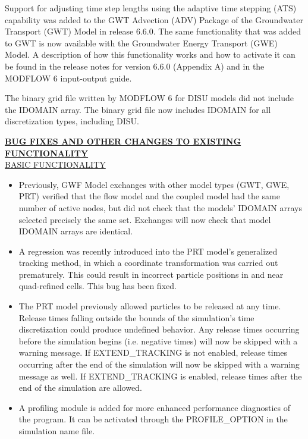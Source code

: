 	
\item \currentmodflowversion
	
	\item Support for adjusting time step lengths using the adaptive time stepping (ATS) capability was added to the GWT Advection (ADV) Package of the Groundwater Transport (GWT) Model in release 6.6.0.  The same functionality that was added to GWT is now available with the Groundwater Energy Transport (GWE) Model.  A description of how this functionality works and how to activate it can be found in the release notes for version 6.6.0 (Appendix A) and in the MODFLOW 6 input-output guide.
	\item The binary grid file written by MODFLOW 6 for DISU models did not include the IDOMAIN array.  The binary grid file now includes IDOMAIN for all discretization types, including DISU.


\textbf{\underline{BUG FIXES AND OTHER CHANGES TO EXISTING FUNCTIONALITY}} \\
\underline{BASIC FUNCTIONALITY}
\begin{itemize}
	\item Previously, GWF Model exchanges with other model types (GWT, GWE, PRT) verified that the flow model and the coupled model had the same number of active nodes, but did not check that the models' IDOMAIN arrays selected precisely the same set. Exchanges will now check that model IDOMAIN arrays are identical.
	\item A regression was recently introduced into the PRT model's generalized tracking method, in which a coordinate transformation was carried out prematurely. This could result in incorrect particle positions in and near quad-refined cells. This bug has been fixed.
	\item The PRT model previously allowed particles to be released at any time. Release times falling outside the bounds of the simulation's time discretization could produce undefined behavior. Any release times occurring before the simulation begins (i.e. negative times) will now be skipped with a warning message. If EXTEND\_TRACKING is not enabled, release times occurring after the end of the simulation will now be skipped with a warning message as well. If EXTEND\_TRACKING is enabled, release times after the end of the simulation are allowed.
	\item A profiling module is added for more enhanced performance diagnostics of the program. It can be activated through the PROFILE_OPTION in the simulation name file.
\end{itemize}

